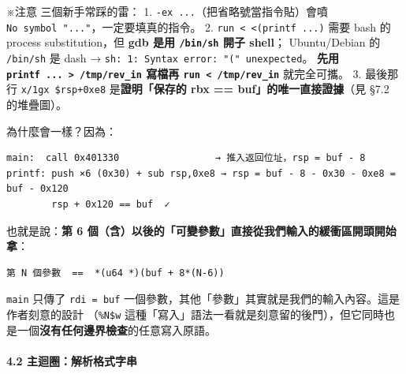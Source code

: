 \documentclass[10pt,a4paper]{article}
\renewenvironment{quote}{%
  \begin{mdframed}[linewidth=0pt,innerleftmargin=0pt,innerrightmargin=0pt,
    innerbottommargin=0pt,innertopmargin=0pt,skipabove=0.55em,skipbelow=0.55em,
    leftmargin=0.9em,rightmargin=0.4em,startcode={\color{quotebar}\vrule width 2.6pt},%
    endcode={}]%
  \itshape\color{black}%
}{%
  \end{mdframed}%
}
\begin{document}
\begin{quote}
※注意 三個新手常踩的雷： 1.
\texttt{-\allowbreak{}ex\ \allowbreak{}\textquotesingle{}\allowbreak{}...\allowbreak{}\textquotesingle{}\allowbreak{}}（把省略號當指令貼）會噴
\texttt{No\ \allowbreak{}symbol\ \allowbreak{}"..."}，一定要填真的指令。 2.
\texttt{run\ \allowbreak{}\textless{}\allowbreak{}\ \allowbreak{}\textless{}\allowbreak{}(printf\ \allowbreak{}...)} 需要 bash 的 process
substitution，但 \textbf{gdb 是用 \texttt{/\allowbreak{}bin/\allowbreak{}sh} 開子 shell}；
Ubuntu/Debian 的 \texttt{/\allowbreak{}bin/\allowbreak{}sh} 是 dash →
\texttt{sh:\allowbreak{}\ \allowbreak{}1:\allowbreak{}\ \allowbreak{}Syntax\ \allowbreak{}error:\allowbreak{}\ \allowbreak{}"("\ \allowbreak{}unexpected}。 \textbf{先用
\texttt{printf\ \allowbreak{}...\allowbreak{}\ \allowbreak{}\textgreater{}\allowbreak{}\ \allowbreak{}/\allowbreak{}tmp/\allowbreak{}rev\_\allowbreak{}in} 寫檔再
\texttt{run\ \allowbreak{}\textless{}\allowbreak{}\ \allowbreak{}/\allowbreak{}tmp/\allowbreak{}rev\_\allowbreak{}in}} 就完全可攜。 3. 最後那行
\texttt{x/\allowbreak{}1gx\ \allowbreak{}\$\allowbreak{}rsp+0xe8} 是\textbf{證明「保存的 rbx ==
buf」的唯一直接證據}（見 §7.2 的堆疊圖）。
\end{quote}

為什麼會一樣？因為：

\begin{Verbatim}[breaklines=true,breakanywhere=true,breakautoindent=false,fontsize=\fontsize{7.0}{9.5}\selectfont]
main:  call 0x401330                 → 推入返回位址，rsp = buf - 8
printf: push ×6 (0x30) + sub rsp,0xe8 → rsp = buf - 8 - 0x30 - 0xe8 = buf - 0x120
        rsp + 0x120 == buf  ✓
\end{Verbatim}

也就是說：\textbf{第 6
個（含）以後的「可變參數」直接從我們輸入的緩衝區開頭開始拿}：

\begin{Verbatim}[breaklines=true,breakanywhere=true,breakautoindent=false,fontsize=\fontsize{7.0}{9.5}\selectfont]
第 N 個參數  ==  *(u64 *)(buf + 8*(N-6))
\end{Verbatim}

\texttt{main} 只傳了 \texttt{rdi\ \allowbreak{}=\ \allowbreak{}buf}
一個參數，其他「參數」其實就是我們的輸入內容。這是作者刻意的設計
（\texttt{\%\allowbreak{}N\$\allowbreak{}w}
這種「寫入」語法一看就是刻意留的後門），但它同時也是一個\textbf{沒有任何邊界檢查}的任意寫入原語。

\paragraph{4.2
主迴圈：解析格式字串}\label{ux4e3bux8ff4ux5708ux89e3ux6790ux683cux5f0fux5b57ux4e32}
\end{document}
